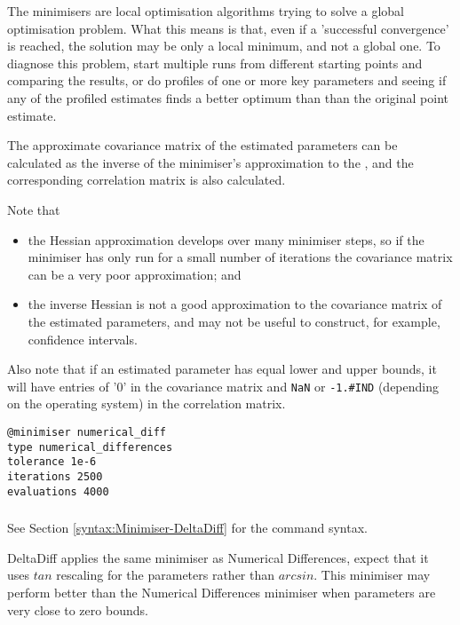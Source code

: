 The minimisers are local optimisation algorithms trying to solve a global optimisation problem. What this means is that, even if a 'successful convergence' is reached, the solution may be only a local minimum, and not a global one. To diagnose this problem, start multiple runs from different starting points and comparing the results, or do profiles of one or more key parameters and seeing if any of the profiled estimates finds a better optimum than than the original point estimate.

The approximate covariance matrix of the estimated parameters can be calculated as the inverse of the minimiser's approximation to the , and the corresponding correlation matrix is also calculated.

Note that

\begin{itemize}
\item the Hessian approximation develops over many minimiser steps, so if the minimiser has only run for a small number of iterations the covariance matrix can be a very poor approximation; and
\item the inverse Hessian is not a good approximation to the covariance matrix of the estimated parameters, and may not be useful to construct, for example, confidence intervals.
\end{itemize}

Also note that if an estimated parameter has equal lower and upper bounds, it will have entries of '0' in the covariance matrix and \texttt{NaN} or \texttt{-1.\#IND} (depending on the operating system) in the correlation matrix.

{\small{\begin{verbatim}
@minimiser numerical_diff
type numerical_differences
tolerance 1e-6
iterations 2500
evaluations 4000
\end{verbatim}}}

\subsubsection{}\label{sec:Minimiser-DeltaDiff}

See Section \ref{syntax:Minimiser-DeltaDiff} for the command syntax.

DeltaDiff applies the same minimiser as Numerical Differences, expect that it uses $tan$ rescaling for the parameters rather than $arcsin$. This minimiser may perform better than the Numerical Differences minimiser when parameters are very close to zero bounds.

